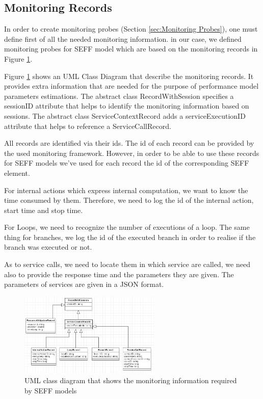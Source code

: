 \subsection{Monitoring Records}
\label{sec:Monitoring Records}
In order to create monitoring probes (Section \ref{sec:Monitoring Probes}), one must define first of all the needed monitoring information. in our case, we defined monitoring probes for SEFF model which are based on the monitoring records in Figure \ref{fig:records}. 

Figure \ref{fig:records} shows an UML Class Diagram that describe the monitoring records. It provides extra information that are needed for the purpose of performance model parameters estimations. The abstract class RecordWithSession specifies a sessionID attribute that helps to identify the monitoring information based on sessions.  The abstract class ServiceContextRecord adds a serviceExecutionID attribute that helps to reference a ServiceCallRecord.

All records are identified via their ids. The id of each record can be provided by the used monitoring framework. However, in order to be able to use these records for SEFF models we've used for each record the id of the corresponding SEFF element. 

For internal actions which express internal computation, we want to know the time consumed by them. Therefore, we need to log the id of the internal action, start time and stop time. 

For Loops, we need to recognize the number of executions of a loop. The same thing for branches, we log the id of the executed branch in order to realise if the branch was executed or not. 

As to service calls, we need to locate them in which service are called, we need also to provide the response time and the parameters they are given. The parameters of services are given in a JSON format.

\begin{figure}[h]
\centering
\includegraphics[width=0.6\textwidth]{figures/records}
\caption{UML class diagram that shows the monitoring information required by SEFF models}
\label{fig:records}
\end{figure}

